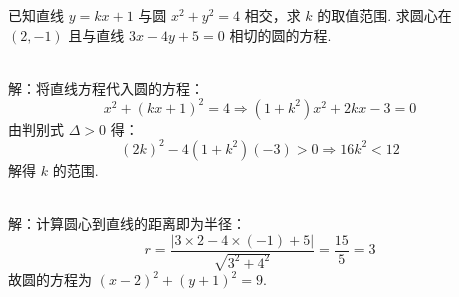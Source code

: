 \documentclass{ctexart}
\newenvironment{MyAnswer}[1][] %
{
    \begin{tcolorbox}[breakable, colframe=blue]
    \begin{Answer}[#1] \color{blue} \kaishu
        }  %
    {\end{Answer}
\end{tcolorbox}
}
\begin{document}
\begin{Exercise}[title={圆与直线位置关系练习}, label={ex:circle-line}]
    \Question 已知直线 $y = kx + 1$ 与圆 $x^2 + y^2 = 4$ 相交，求 $k$ 的取值范围.
    \Question 求圆心在 $(2,-1)$ 且与直线 $3x - 4y + 5 = 0$ 相切的圆的方程.
\end{Exercise}

\begin{MyAnswer}[ref={ex:circle-line}]


    \Question {}\\ 
    解：将直线方程代入圆的方程：
    $$
    x^2 + (kx + 1)^2 = 4 \Rightarrow (1 + k^2)x^2 + 2kx - 3 = 0
    $$
    由判别式 $\Delta > 0$ 得：
    $$
    (2k)^2 - 4(1 + k^2)(-3) > 0 \Rightarrow 16k^2 < 12
    $$
    解得 $k$ 的范围.

    \Question {}\\ 
    解：计算圆心到直线的距离即为半径：
    $$
    r = \frac{|3 \times 2 - 4 \times (-1) + 5|}{\sqrt{3^2 + 4^2}} = \frac{15}{5} = 3
    $$
    故圆的方程为 $(x-2)^2 + (y+1)^2 = 9$.
\end{MyAnswer}
\end{document}
